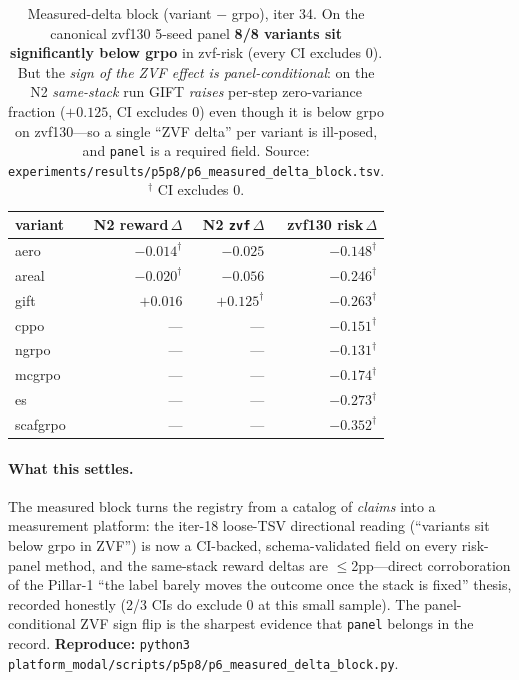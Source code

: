 \documentclass{article}
\begin{document}
\begin{table}[t]
\centering\small
\caption{Measured-delta block (variant $-$ grpo), iter 34. On the
canonical zvf130 5-seed panel \textbf{8/8 variants sit significantly
below grpo} in zvf-risk (every CI excludes 0). But the \emph{sign of the
ZVF effect is panel-conditional}: on the N2 \emph{same-stack} run GIFT
\emph{raises} per-step zero-variance fraction ($+0.125$, CI excludes 0)
even though it is below grpo on zvf130---so a single ``ZVF delta'' per
variant is ill-posed, and \texttt{panel} is a required field.
Source: \texttt{experiments/results/p5p8/p6\_measured\_delta\_block.tsv}.
$^{\dagger}$ CI excludes 0.}
\label{tab:p6-measured-delta}
\begin{tabular}{l r r r}
\toprule
variant & N2 reward\,$\Delta$ & N2 \texttt{zvf}\,$\Delta$ & zvf130 risk\,$\Delta$ \\
\midrule
aero     & $-0.014^{\dagger}$ & $-0.025$            & $-0.148^{\dagger}$ \\
areal    & $-0.020^{\dagger}$ & $-0.056$            & $-0.246^{\dagger}$ \\
gift     & $+0.016$           & $+0.125^{\dagger}$  & $-0.263^{\dagger}$ \\
cppo     & ---                & ---                 & $-0.151^{\dagger}$ \\
ngrpo    & ---                & ---                 & $-0.131^{\dagger}$ \\
mcgrpo   & ---                & ---                 & $-0.174^{\dagger}$ \\
es       & ---                & ---                 & $-0.273^{\dagger}$ \\
scafgrpo & ---                & ---                 & $-0.352^{\dagger}$ \\
\bottomrule
\end{tabular}
\end{table}

\paragraph{What this settles.} The measured block turns the registry from
a catalog of \emph{claims} into a measurement platform: the iter-18
loose-TSV directional reading (``variants sit below grpo in ZVF'') is now
a CI-backed, schema-validated field on every risk-panel method, and the
same-stack reward deltas are $\leq$2pp---direct corroboration of the
Pillar-1 ``the label barely moves the outcome once the stack is fixed''
thesis, recorded honestly (2/3 CIs do exclude 0 at this small sample).
The panel-conditional ZVF sign flip is the sharpest evidence that
\texttt{panel} belongs in the record. \textbf{Reproduce:}
\texttt{python3 platform_modal/scripts/p5p8/p6\_measured\_delta\_block.py}.
\end{document}
